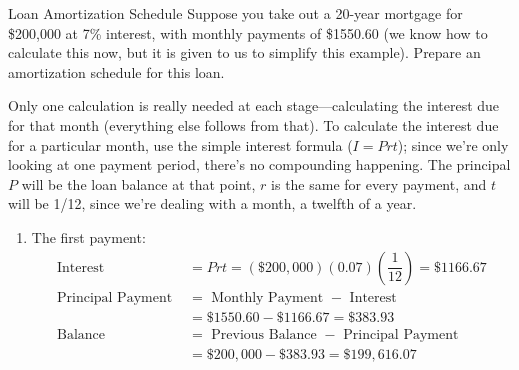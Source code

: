 \begin{example}[https://www.youtube.com/watch?v=bgFXXvgNB0g&list=PLfmpjsIzhztsZtnb7HnXrQ8SLoiOCIcAM&index=41]{Loan Amortization Schedule}
Suppose you take out a 20-year mortgage for \$200,000 at 7\% interest, with monthly payments of \$1550.60 (we know how to calculate this now, but it is given to us to simplify this example).  Prepare an amortization schedule for this loan.

\sol
Only one calculation is really needed at each stage---calculating the interest due for that month (everything else follows from that).  To calculate the interest due for a particular month, use the simple interest formula ($I=Prt$); since we're only looking at one payment period, there's no compounding happening.  The principal $P$ will be the loan balance at that point, $r$ is the same for every payment, and $t$ will be 1/12, since we're dealing with a month, a twelfth of a year.
\begin{enumerate}
\item The first payment:
\begin{align*}
\textrm{Interest } &= Prt = (\$200,000)(0.07)\left(\dfrac{1}{12}\right) = \$1166.67\\
\textrm{Principal Payment } &= \textrm{ Monthly Payment } - \textrm{ Interest}\\
&= \$1550.60 - \$1166.67 = \$383.93\\
\textrm{Balance } &= \textrm{ Previous Balance } - \textrm{ Principal Payment}\\
&= \$200,000 - \$383.93 = \$199,616.07
\end{align*}


\end{enumerate}
\end{example}
